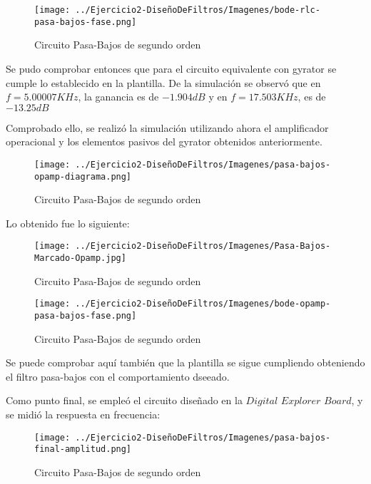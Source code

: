 \begin{figure}[H]
    \centering
    \texttt{[image: ../Ejercicio2-DiseñoDeFiltros/Imagenes/bode-rlc-pasa-bajos-fase.png]}
    \caption{Circuito Pasa-Bajos de segundo orden}
\end{figure}

Se pudo comprobar entonces que para el circuito equivalente con gyrator se cumple lo establecido en la plantilla.
De la simulación se observó que en $f=5.00007 KHz$, la ganancia es de $-1.904 dB$ y en $f=17.503KHz$, es de $-13.25 dB$


Comprobado ello, se realizó la simulación utilizando ahora el amplificador operacional y los elementos pasivos del gyrator obtenidos anteriormente.

\begin{figure}[H]
    \centering
    \texttt{[image: ../Ejercicio2-DiseñoDeFiltros/Imagenes/pasa-bajos-opamp-diagrama.png]}
    \caption{Circuito Pasa-Bajos de segundo orden}
\end{figure}

Lo obtenido fue lo siguiente:

\begin{figure}[H]
    \centering
    \texttt{[image: ../Ejercicio2-DiseñoDeFiltros/Imagenes/Pasa-Bajos-Marcado-Opamp.jpg]}
    \caption{Circuito Pasa-Bajos de segundo orden}
\end{figure}

\begin{figure}[H]
    \centering
    \texttt{[image: ../Ejercicio2-DiseñoDeFiltros/Imagenes/bode-opamp-pasa-bajos-fase.png]}
    \caption{Circuito Pasa-Bajos de segundo orden}
\end{figure}

Se puede comprobar aquí también que la plantilla se sigue cumpliendo obteniendo el filtro pasa-bajos con el comportamiento dseeado.

Como punto final, se empleó el circuito diseñado en la $Digital$ $Explorer$ $Board$, y se midió la respuesta en frecuencia:

\begin{figure}[H]
    \centering
    \texttt{[image: ../Ejercicio2-DiseñoDeFiltros/Imagenes/pasa-bajos-final-amplitud.png]}
    \caption{Circuito Pasa-Bajos de segundo orden}
\end{figure}

